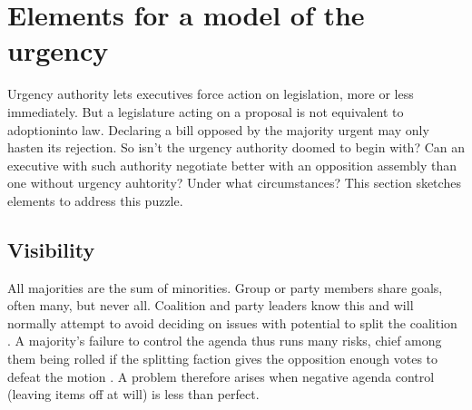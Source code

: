 \documentclass[letter,12pt]{article}
\begin{document}
\section{Elements for a model of the urgency}

Urgency authority lets executives force action on legislation, more or less immediately. But a legislature acting on a proposal is not equivalent to adoptioninto law. Declaring a bill opposed by the majority urgent may only hasten its rejection. So isn't the urgency authority doomed to begin with? Can an executive with such authority negotiate better with an opposition assembly than one without urgency auhtority? Under what circumstances? This section sketches elements to address this puzzle. 



\subsection{Visibility}

All majorities are the sum of minorities. Group or party members share goals, often many, but never all. Coalition and party leaders know this and will normally attempt to avoid deciding on issues with potential to split the coalition \citep{riker.1986,shepsle.2003}. A majority's failure to control the agenda thus runs many risks, chief among them being rolled if the splitting faction gives the opposition enough votes to defeat the motion \citep{cox.mccubbins.2005}. A problem therefore arises when negative agenda control (leaving items off at will) is less than perfect. 
\end{document}
